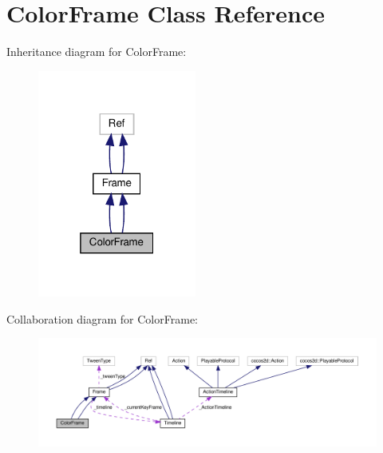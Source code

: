 \hypertarget{classColorFrame}{}\section{Color\+Frame Class Reference}
\label{classColorFrame}


Inheritance diagram for Color\+Frame\+:
\nopagebreak
\begin{figure}[H]
\begin{center}
\leavevmode
\includegraphics[width=148pt]{classColorFrame__inherit__graph}
\end{center}
\end{figure}


Collaboration diagram for Color\+Frame\+:
\nopagebreak
\begin{figure}[H]
\begin{center}
\leavevmode
\includegraphics[width=350pt]{classColorFrame__coll__graph}
\end{center}
\end{figure}
